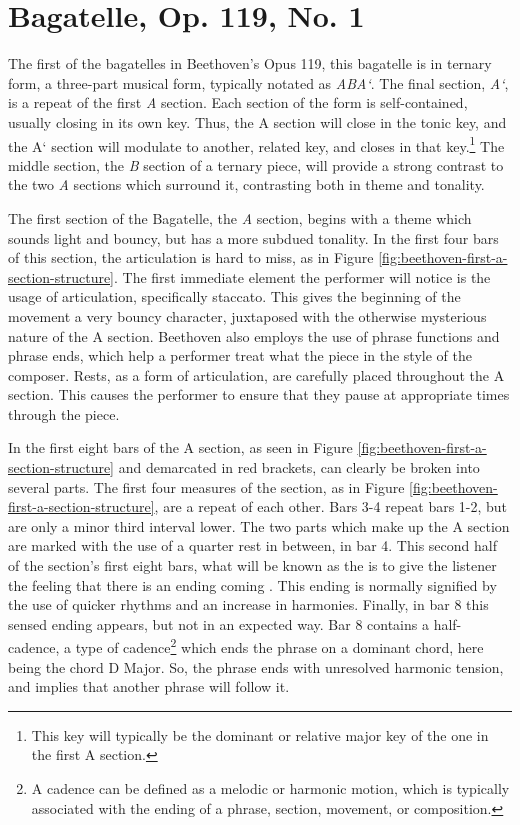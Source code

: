 \section{Bagatelle, Op. 119, No. 1}
The first of the bagatelles in Beethoven's Opus 119, this bagatelle is in ternary form, a three-part musical form, typically notated as \textit{ABA`}. The final section, \textit{A`}, is a repeat of the first \textit{A} section. Each section of the form is self-contained, usually closing in its own key\autocite{Tucker_Cochrane_2011}. Thus, the A section will close in the tonic key, and the A` section will modulate to another, related key, and closes in that key.\footnote{This key will typically be the dominant or relative major key of the one in the first A section.} The middle section, the \textit{B} section of a ternary piece, will provide a strong contrast to the two \textit{A} sections which surround it, contrasting both in theme and tonality.

The first section of the Bagatelle, the \textit{A} section, begins with a theme which sounds light and bouncy, but has a more subdued tonality. In the first four bars of this section, the articulation is hard to miss, as in Figure \ref{fig:beethoven-first-a-section-structure}\autocite{Henle_1978}. The first immediate element the performer will notice is the usage of articulation, specifically staccato. This gives the beginning of the movement a very bouncy character, juxtaposed with the otherwise mysterious nature of the A section. Beethoven also employs the use of phrase functions and phrase ends, which help a performer treat what the piece  in the style of the composer. Rests, as a form of articulation, are carefully placed throughout the A section. This causes the performer to ensure that they pause at appropriate times through the piece. 

In the first eight bars of the A section, as seen in Figure \ref{fig:beethoven-first-a-section-structure}\autocite{Henle_1978} and demarcated in red brackets, can clearly be broken into several parts. The first four measures of the section, as in Figure \ref{fig:beethoven-first-a-section-structure}\autocite{Henle_1978}, are a repeat of each other. Bars 3-4 repeat bars 1-2, but are only a minor third interval lower. The two parts which make up the A section are marked with the use of a quarter rest in between, in bar 4. This second half of the section's first eight bars, what will be known as the  is to give the listener the feeling that there is an ending coming \autocite{Kerman_Tyson_Burnham_Johnson_Drabkin_2001}. This ending is normally signified by the use of quicker rhythms and an increase in harmonies. Finally, in bar 8 this sensed ending appears, but not in an expected way. Bar 8 contains a half-cadence, a type of cadence\footnote{A cadence can be defined as a melodic or harmonic motion, which is typically associated with the ending of a phrase, section, movement, or composition.}\autocite{Nagley_Whittall_2011} which ends the phrase on a dominant chord, here being the chord D Major. So, the phrase ends with unresolved harmonic tension, and implies that another phrase will follow it.

